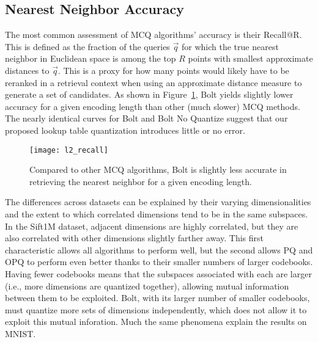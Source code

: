 \vspace*{-4mm}
\subsection{Nearest Neighbor Accuracy}

The most common assessment of MCQ algorithms' accuracy is their Recall@R. This is defined as the fraction of the queries $\vec{q}$ for which the true nearest neighbor in Euclidean space is among the top $R$ points with smallest approximate distances to $\vec{q}$. This is a proxy for how many points would likely have to be reranked in a retrieval context when using an approximate distance measure to generate a set of candidates. As shown in Figure~\ref{fig:nn_acc}, Bolt yields slightly lower accuracy for a given encoding length than other (much slower) MCQ methods. The nearly identical curves for Bolt and Bolt No Quantize suggest that our proposed lookup table quantization introduces little or no error. %

\begin{figure}[h]
\begin{center}
\texttt{[image: l2\_recall]}
\vspace*{-3mm}
\caption{Compared to other MCQ algorithms, Bolt is slightly less accurate in retrieving the nearest neighbor for a given encoding length.}
\label{fig:nn_acc}
\end{center}
\end{figure}

The differences across datasets can be explained by their varying dimensionalities and the extent to which correlated dimensions tend to be in the same subspaces. In the Sift1M dataset, adjacent dimensions are highly correlated, but they are also correlated with other dimensions slightly farther away. This first characteristic allows all algorithms to perform well, but the second allows PQ and OPQ to perform even better thanks to their smaller numbers of larger codebooks. Having fewer codebooks means that the subspaces associated with each are larger (i.e., more dimensions are quantized together), allowing mutual information between them to be exploited. Bolt, with its larger number of smaller codebooks, must quantize more sets of dimensions independently, which does not allow it to exploit this mutual inforation. Much the same phenomena explain the results on MNIST.

